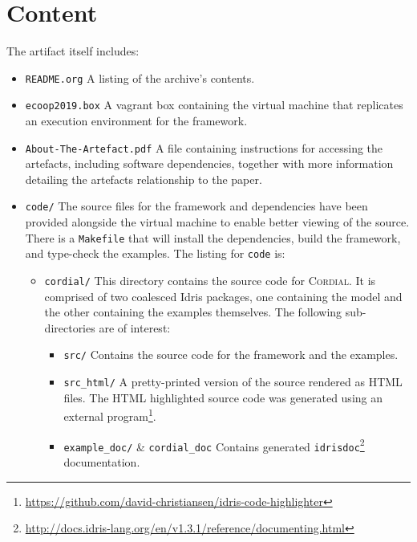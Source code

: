 \documentclass[a4paper,UKenglish]{darts-v2019}
\newenvironment{content}{\section{Content}}{}
\newcommand{\theFramework}{\textsc{Cordial}}
\begin{document}
\begin{content}
The artifact itself includes:
\begin{itemize}
\item
  \texttt{README.org}
  \newline
  A listing of the archive's contents.
\item
  \texttt{ecoop2019.box}
  \newline
  A vagrant box containing the virtual machine that replicates an execution environment for the framework.
\item
  \texttt{About-The-Artefact.pdf}
  \newline
  A file containing instructions for accessing the artefacts, including software dependencies, together with more information detailing the artefacts relationship to the paper.
\item
  \texttt{code/}
  \newline
  The source files for the framework and dependencies have been provided alongside the virtual machine to enable better viewing of the source.
  There is a \texttt{Makefile} that will install the dependencies, build the framework, and type-check the examples.
  The listing for \texttt{code} is:
  \begin{itemize}
  \item
    \texttt{cordial/}
    \newline
    This directory contains the source code for \theFramework{}.
    It is comprised of two coalesced Idris packages, one containing the model and the other containing the examples themselves.
    The following sub-directories are of interest:
  \begin{itemize}
  \item
    \texttt{src/}
    \newline
    Contains the source code for the framework and the examples.
  \item
    \texttt{src\_html/}
    \newline
    A pretty-printed version of the source rendered as HTML files.
    The HTML highlighted source code was generated using an external program\footnote{\url{https://github.com/david-christiansen/idris-code-highlighter}}.
  \item
    \texttt{example\_doc/} \& \texttt{cordial\_doc}
    \newline
    Contains generated \texttt{idrisdoc}\footnote{\url{http://docs.idris-lang.org/en/v1.3.1/reference/documenting.html}} documentation.
  \end{itemize}


\end{itemize}
\end{itemize}
\end{content}
\end{document}
